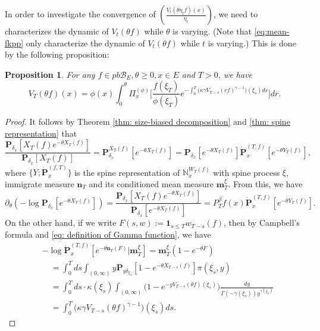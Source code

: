 \documentclass[12pt, a4paper]{amsart}
\newtheorem{prop}[thm]{Proposition}
\theoremstyle{definition}
\numberwithin{equation}{section}
\begin{document}
	In order to investigate the convergence of $(\frac{ V_t(\theta \eta_t f)(x)}{\eta_t})$, we need to characterizes the dynamic of $V_t(\theta f)$ while $\theta$ is varying. 
	(Note that \eqref{eq:mean-fkpp} only characterize the dynamic of $V_t(\theta f)$ while $t$ is varying.)
	This is done by the following proposition:

\begin{prop}
	For any $f\in pb\mathscr B_E,\theta \geq 0,x\in E$ and $T>0$, we have
\[\label{eq: equation for Vt(theta f) for theta}
	V_T ( \theta f) ( x)
	= \phi( x) \int_0^\theta \Pi_x^{(\phi)} \Big[ \frac{ f(\xi_T) } { \phi(\xi_T) } e^{ - \int_0^T \big( \kappa \gamma V_{T-s} (r f)^{ \gamma - 1} \big) ( \xi_s) ds} \Big] dr.
\]
\end{prop}

\begin{proof}
	It follows by Theorem \ref{thm: size-biased decomposition} and \ref{thm: spine representation} that
\[
	\frac{ \mathbf P_{\delta_x}[X_T(f)e^{-\theta X_T(f)}] } {  \mathbf P_{\delta_x} [X_T(f)] }
	= \mathbf P_{\delta_x}^{X_T(f)} [e^{-\theta X_T(f)}] 
	= \mathbf P_{\delta_x} [e^{-\theta X_T(f)}] \dot {\mathbf P}_x^{(T,f)}[e^{-\theta Y_T(f)}],
\]
	where $\{Y; \dot {\mathbf P}^{(f,T)}_x\}$ is the spine representation of $\mathbb N^{W_T(f)}_x$ with spine process $\xi$, immigrate measure $\mathbf n_T$ and its conditioned mean measure $\mathbf m^\xi_T$.
	From this, we have
\[ \label{eq: dynamic of theta on v_t theta reason 1}
	\partial_\theta (-\log \mathbf P_{\delta_x}[e^{-\theta X_T(f)}])
	= \frac{\mathbf P_{\delta_x}[X_T(f)e^{-\theta X_T(f)}]}{\mathbf P_{\delta_x}[e^{-\theta X_T(f)}]}
	= P^\beta_T f(x) \dot {\mathbf P}_x^{(T,f)}[e^{-\theta Y_T(f)}].
\]
	On the other hand, if we write $F(s,w):= \mathbf 1_{s\leq T} w_{T-s}(f)$, then by Campbell's formula and \eqref{eq: definition of Gamma function}, we have
\[\label{eq: dynamic of theta on v_t theta reason 2}\begin{split}
	&-\log \dot {\mathbf P}^{(T,f)}_{x}[e^{-\theta \mathbf n_T(F)}|\mathbf m_T^\xi] 
	= \mathbf m_T^\xi(1-e^{-\theta F})
	\\&\quad = \int_0^T ds \int_{(0,\infty)} y \mathbf P_{y\delta_{\xi_s}}[1- e^{-\theta X_{T-s}(f)}] \pi(\xi_s,y)
	\\&\quad = \int_0^T ds \cdot \kappa(\xi_s) \int_{(0,\infty)} \mathbf (1- e^{- y V_{T-s}(\theta f)(\xi_s)}) \frac{dy}{\Gamma(-\gamma(\xi_s)) y^{\gamma(\xi_s)}}
	\\&\quad = \int_0^T \big(\kappa\gamma V_{T-s}(\theta f)^{\gamma-1}\big)(\xi_s) ds.
\end{split}\]

\end{proof}
\end{document}
